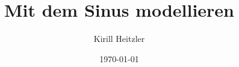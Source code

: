 \documentclass[11pt]{beamer}
\title{Mit dem Sinus modellieren}
\author{Kirill Heitzler}
\date{\today}
\begin{document}
\begin{frame}
    \titlepage
\end{frame}

\begin{frame}
    \tableofcontents
\end{frame}




%
%
%
\end{document}
